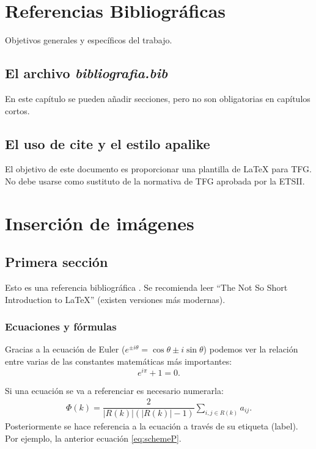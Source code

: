 \documentclass[twoside]{urjc-tfg}
\begin{document}
\chapter{Referencias Bibliográficas}
\label{sec:bib}

Objetivos generales y específicos del trabajo.

\section{El archivo \emph{bibliografia.bib}}

En este capítulo se pueden añadir secciones, pero no son obligatorias
en capítulos cortos.

\section{El uso de cite y el estilo apalike}

El objetivo de este documento es proporcionar una plantilla de \LaTeX
para TFG. No debe usarse como sustituto de la normativa de TFG
aprobada por la ETSII.



\chapter{Inserción de imágenes}




\section{Primera sección}

Esto es una referencia bibliográfica . Se recomienda
leer ``The Not So Short Introduction to \LaTeX'' \cite{Oetiker2007}
(existen versiones más modernas).


\subsection{Ecuaciones y fórmulas}

Gracias a la ecuación de Euler
($e^{ \pm i\theta } = \cos \theta \pm i\sin \theta$) podemos ver la
relación entre varias de las constantes matemáticas más importantes:
\[
    e^{i\pi} + 1 = 0.
\]


Si una ecuación se va a referenciar es necesario numerarla:
\begin{eqnarray}
\label{eq:schemeP}
 \Phi (k)=\dfrac{2}{|R(k)|(|R(k)|-1)} \underset{i,j \in R(k)}{\sum} a_{ij}.
\end{eqnarray}
Posteriormente se hace referencia a la ecuación a través de su
etiqueta (label). Por ejemplo, la anterior ecuación
\eqref{eq:schemeP}.
\end{document}
